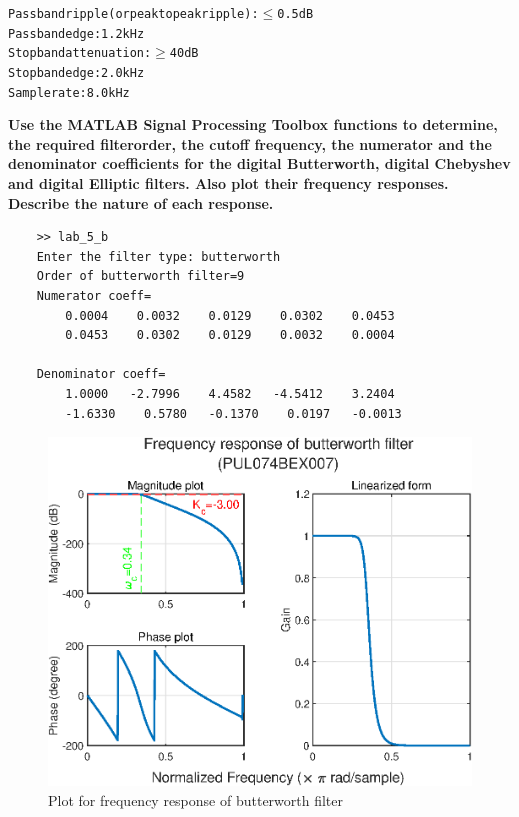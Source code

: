\documentclass{lab_sheet}
\begin{document}
\begin{alltt}
    Pass band ripple (or peak to peak ripple):\ensuremath{\leq} 0.5 dB
    Pass band edge: 1.2 kHz
    Stop band attenuation:\ensuremath{\geq} 40 dB
    Stop band edge: 2.0 kHz
    Sample rate: 8.0 kHz
\end{alltt}
\textbf{Use the MATLAB Signal Processing Toolbox functions to determine, the required filterorder, the cutoff frequency, the numerator and the denominator coefficients for the dig­ital Butterworth, digital Chebyshev and digital Elliptic filters. Also plot their frequency responses. Describe the nature of each response.}
\pagebreak
{}
\begin{verbatim}
    >> lab_5_b
    Enter the filter type: butterworth
    Order of butterworth filter=9
    Numerator coeff=
        0.0004    0.0032    0.0129    0.0302    0.0453    
        0.0453    0.0302    0.0129    0.0032    0.0004

    Denominator coeff=
        1.0000   -2.7996    4.4582   -4.5412    3.2404   
        -1.6330    0.5780   -0.1370    0.0197   -0.0013
\end{verbatim}
\begin{figure}[H]
    \centering
    \includegraphics[width=0.8\linewidth]{../Figures/butterworth.eps}
    \caption{Plot for frequency response of butterworth filter}
    \label{fig:5_2_butter}
\end{figure}
\end{document}
